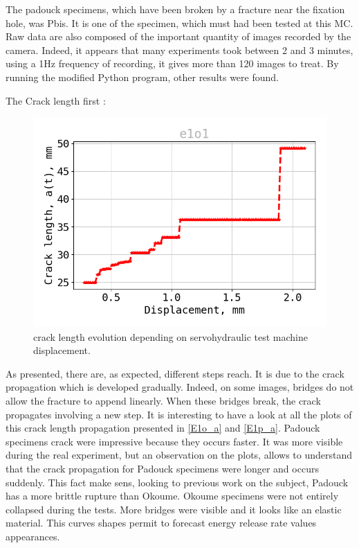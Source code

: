 The padouck specimens, which have been broken by a fracture near the fixation hole, was Pbis. It is one of the specimen, which must had been tested at this MC. 
Raw data are also composed of the important quantity of images recorded by the camera. Indeed, it appears that many experiments took between 2 and 3 minutes, using a 1Hz frequency of recording, it gives more than 120 images to treat.
By running the modified Python program, other results were found.

The Crack length first :

\begin{figure}[th]
	\centering
	\includegraphics[scale=0.4]{Figures/e1o1_a}
	\caption[crack length evolution depending on hydraulic press displacement]{crack length evolution depending on servohydraulic test machine displacement.}
	\label{fig:e1o1_a}
\end{figure}

As presented, there are, as expected, different steps reach. It is due to the crack propagation which is developed gradually. Indeed, on some images, bridges do not allow the fracture to append linearly. When these bridges break, the crack propagates involving a new step. It is interesting to have a look at all the plots of this crack length propagation presented in \ref{E1o_a} and \ref{E1p_a}. Padouck specimens crack were impressive because they occurs faster. It was more visible during the real experiment, but an observation on the plots, allows to understand that the crack propagation for Padouck specimens were longer and occurs suddenly. This fact make sens, looking to previous work on the subject, Padouck has a more brittle rupture than Okoume. Okoume specimens were not entirely collapsed during the tests. More bridges were visible and it looks like an elastic material. This curves shapes permit to forecast energy release rate values appearances.

